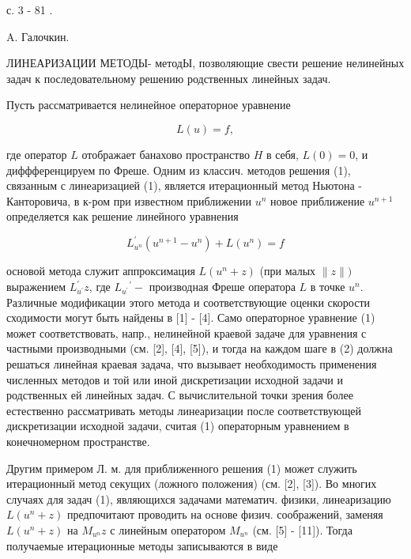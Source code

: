 \documentclass[10pt]{article}
\begin{document}
с. 3 - 81 .

A. Галочкин.



ЛИНЕАРИЗАЦИИ МЕТОДЫ- методЫ, позволяющие свести решение нелинейных задач к последовательному решению родственных линейных задач.



Пусть рассматривается нелинейное операторное уравнение



\[

L(u)=f,

\]



где оператор $L$ отображает банахово пространство $H$ в себя, $L(0)=0$, и диффференцируем по Фреше. Одним из классич. методов решения (1), связанным с линеаризацией (1), является итерационный метод Ньютона - Канторовича, в к-ром при известном приближении $u^{n}$ новое приближение $u^{n+1}$ определяется как решение линейного уравнения



\[

L_{u^{n}}^{\prime}\left(u^{n+1}-u^{n}\right)+L\left(u^{n}\right)=f

\]



основой метода служит аппроксимация $L\left(u^{n}+z\right)$ (при малых $\|z\|)$ выражением $L_{u^{\prime}}^{\prime} z$, где $L_{u^{\prime}}{ }^{\prime}-$ производная Фреше оператора $L$ в точке $u^{n}$. Различные модификации этого метода и соответствующие оценки скорости сходимости могут быть найдены в [1] - [4]. Само операторное уравнение (1) может соответствовать, напр., нелинейной краевой задаче для уравнения с частными производными (см. [2], [4], [5]), и тогда на каждом шаге в (2) должна решаться линейная краевая задача, что вызывает необходимость применения численных методов и той или иной дискретизации исходной задачи и родственных ей линейных задач. С вычислительной точки зрения более естественно рассматривать методы линеаризации после соответствующей дискретизации исходной задачи, считая (1) операторным уравнением в конечномерном пространстве.



Другим примером Л. м. для приближенного решения (1) может служить итерационный метод секущих (ложного положения) (см. [2], [3]). Во многих случаях для задач (1), являющихся задачами математич. физики, линеаризацию $L\left(u^{n}+z\right)$ предпочитают проводить на основе физич. соображений, заменяя $L\left(u^{n}+z\right)$ на $M_{u^{n}} z$ с линейным оператором $M_{u^{n}}$ (см. [5] - [11]). Тогда получаемые итерационные методы записываются в виде
\end{document}
